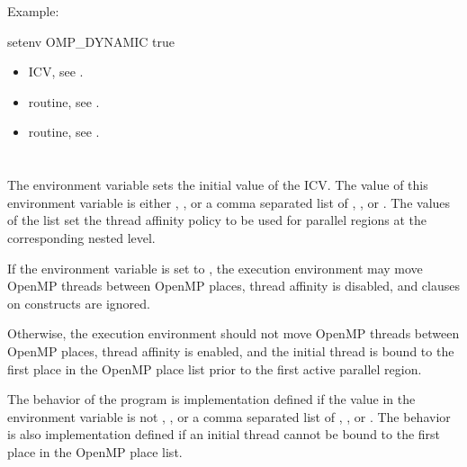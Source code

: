 Example:
\begin{ompEnv}
setenv OMP_DYNAMIC true
\end{ompEnv}

\crossreferences
\begin{itemize}
\item {} ICV, see .

\item {} routine, see .

\item {} routine, see .
\end{itemize}









\section{}
\label{sec:OMP_PROC_BIND}
The  environment variable sets the initial value of the  ICV.
The value of this environment variable is either , , or a comma separated
list of , , or . The values of the list set the thread affinity policy
to be used for parallel regions at the corresponding nested level.

If the environment variable is set to , the execution environment may move
OpenMP threads between OpenMP places, thread affinity is disabled, and 
clauses on  constructs are ignored.

Otherwise, the execution environment should not move OpenMP threads between
OpenMP places, thread affinity is enabled, and the initial thread is bound to the first
place in the OpenMP place list prior to the first active parallel region.

The behavior of the program is implementation defined if the value in the
 environment variable is not , , or a comma separated
list of , , or . The behavior is also implementation defined if an
initial thread cannot be bound to the first place in the OpenMP place list.

